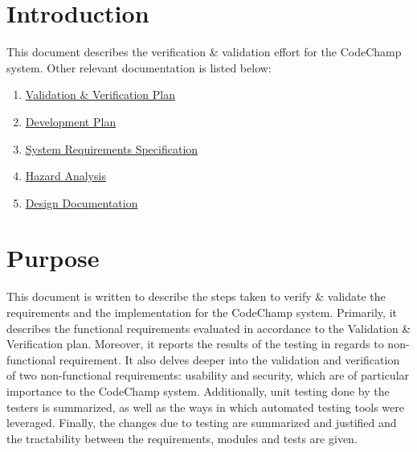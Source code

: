 \documentclass[12pt, titlepage]{article}
\begin{document}
\newpage

\tableofcontents

\listoftables %

\listoffigures %

\newpage


\section{Introduction}
This document describes the verification \& validation effort for the CodeChamp system. Other relevant documentation is listed below:
\begin{enumerate}
    \item \href{https://github.com/Tamas-Leung/CodeChamp/blob/main/docs/VnVPlan}{Validation \& Verification Plan} 
    \item \href{https://github.com/Tamas-Leung/CodeChamp/tree/main/docs/DevelopmentPlan}{Development Plan}
    \item \href{https://github.com/Tamas-Leung/CodeChamp/tree/main/docs/SRS}{System Requirements Specification} 
    \item \href{https://github.com/Tamas-Leung/CodeChamp/blob/main/docs/HazardAnalysis/HazardAnalysis.md}{Hazard Analysis}
    \item \href{https://github.com/Tamas-Leung/CodeChamp/blob/main/docs/Design/SystDesign/SystemDesign.pdf}{Design Documentation}
    
\end{enumerate}

\section{Purpose}

This document is written to describe the steps taken to verify \& validate the  requirements and the implementation for the CodeChamp system. Primarily, it describes the functional requirements evaluated in accordance to the Validation \& Verification plan. Moreover, it reports the results of the testing in regards to non-functional requirement. It  also delves deeper into the validation and verification of two non-functional requirements: usability and security, which are of particular importance to the CodeChamp system. Additionally, unit testing done by the testers is summarized, as well as the ways in which automated testing tools were leveraged. Finally, the changes due to testing are summarized and justified and the tractability between the requirements, modules and tests are given. 
\end{document}
